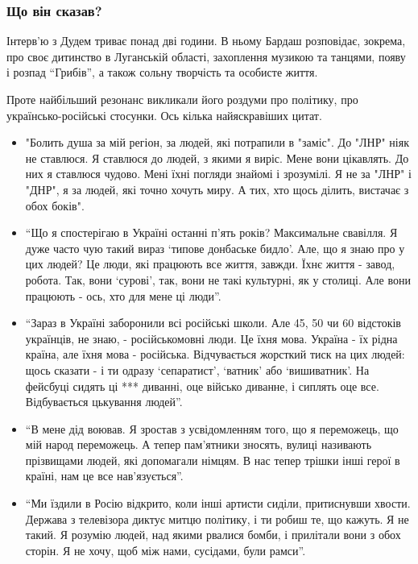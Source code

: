 \subsubsection{Що він сказав?}

Інтерв'ю з Дудем триває понад дві години. В ньому Бардаш розповідає, зокрема,
про своє дитинство в Луганській області, захоплення музикою та танцями, появу і
розпад \enquote{Грибів}, а також сольну творчість та особисте життя.

Проте найбільший резонанс викликали його роздуми про політику, про
українсько-російські стосунки. Ось кілька найяскравіших цитат.

\begin{itemize}
    \item "Болить душа за мій регіон, за людей, які потрапили в "заміс". До "ЛНР" ніяк не ставлюся. Я ставлюся до людей, з якими я виріс. Мене вони цікавлять. До них я ставлюся чудово. Мені їхні погляди знайомі і зрозумілі. Я не за "ЛНР" і "ДНР", я за людей, які точно хочуть миру. А тих, хто щось ділить, вистачає з обох боків".

    \item \enquote{Що я спостерігаю в Україні останні п'ять років? Максимальне свавілля. Я дуже часто чую такий вираз 
						\enquote{типове донбаське бидло}. Але, що я знаю про у цих людей? Це люди, які працюють все життя, завжди. 
						Їхнє життя - завод, робота. Так, вони \enquote{сурові}, так, вони не такі культурні, як у столиці. 
						Але вони працюють - ось, хто для мене ці люди}.

    \item \enquote{Зараз в Україні заборонили всі російські школи. Але 45, 50 чи 60 відстоків українців, не знаю, - російськомовні люди. Це їхня мова. Україна - їх рідна країна, але їхня мова - російська. Відчувається жорсткий тиск на цих людей: щось сказати - і ти одразу
\enquote{сепаратист}, 
\enquote{ватник} або \enquote{вишиватник}. 
На фейсбуці сидять ці *** диванні, оце військо диванне, і сиплять оце все. Відбувається цькування людей}.

		\item \enquote{В мене дід воював. Я зростав з усвідомленням того, що я
						переможець, що мій народ переможець. А тепер пам'ятники зносять,
						вулиці називають прізвищами людей, які допомагали німцям. В нас
						тепер трішки інші герої в країні, нам це все нав'язується}.

		\item \enquote{Ми їздили в Росію відкрито, коли інші артисти сиділи,
притиснувши хвости. Держава з телевізора диктує митцю політику, і
ти робиш те, що кажуть. Я не такий. Я розумію людей, над якими
рвалися бомби, і прилітали вони з обох сторін. Я не хочу, щоб
між нами, сусідами, були рамси}.
\end{itemize}
